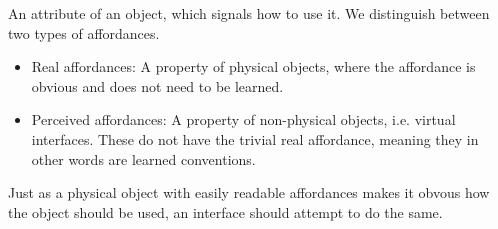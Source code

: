 \begin{definition}[Affordance] \label{def:affordance} 
  An attribute of an object, which signals how to use it. We distinguish between two types of affordances.
  \begin{itemize}
    \item Real affordances: A property of physical objects, where the affordance is obvious and does not need to be learned.
    \item Perceived affordances: A property of non-physical objects, i.e. virtual interfaces. These do not have the trivial real affordance, meaning they in other words are learned conventions.
    \end{itemize}
    Just as a physical object with easily readable affordances makes it obvous how the object should be used, an interface should attempt to do the same. \cite[p. 30]{rogers}
\end{definition}